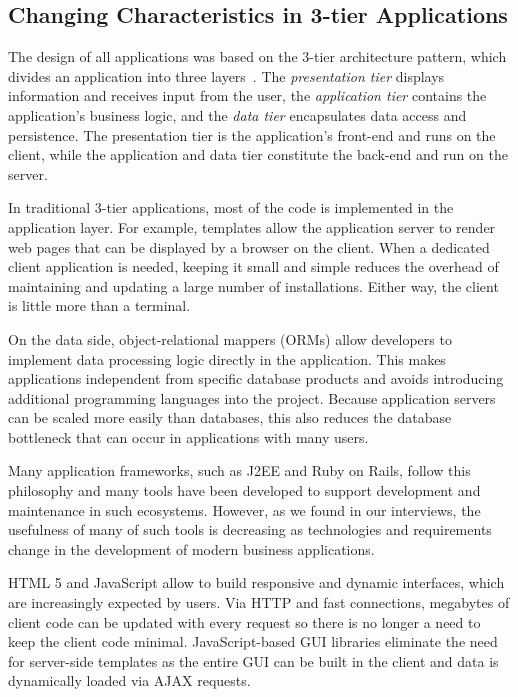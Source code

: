 \subsection{Changing Characteristics in 3-tier Applications}

The design of all applications was based on the 3-tier architecture pattern, which divides an application into three layers~\cite{eckerson_95_three_tier_clientserver_architecture}.
The \emph{presentation tier} displays information and receives input from the user,
the \emph{application tier} contains the application's business logic, and
the \emph{data tier} encapsulates data access and persistence.
The presentation tier is the application's front-end and runs on the client, while the application and data tier constitute the back-end and run on the server.

In traditional 3-tier applications, most of the code is implemented in the application layer.
For example, templates allow the application server to render web pages that can be displayed by a browser on the client.
When a dedicated client application is needed, keeping it small and simple reduces the overhead of maintaining and updating a large number of installations.
Either way, the client is little more than a terminal.

On the data side, object-relational mappers (ORMs) allow developers to implement data processing logic directly in the application.
This makes applications independent from specific database products and avoids introducing additional programming languages into the project.
Because application servers can be scaled more easily than databases, this also reduces the database bottleneck that can occur in applications with many users.

Many application frameworks, such as J2EE and Ruby on Rails, follow this philosophy and many tools have been developed to support development and maintenance in such ecosystems.
However, as we found in our interviews, the usefulness of many of such tools is decreasing as technologies and requirements change in the development of modern business applications.

HTML 5 and JavaScript allow to build responsive and dynamic interfaces, which are increasingly expected by users.
Via HTTP and fast connections, megabytes of client code can be updated with every request so there is no longer a need to keep the client code minimal.
JavaScript-based GUI libraries eliminate the need for server-side templates as the entire GUI can be built in the client and data is dynamically loaded via AJAX requests.

